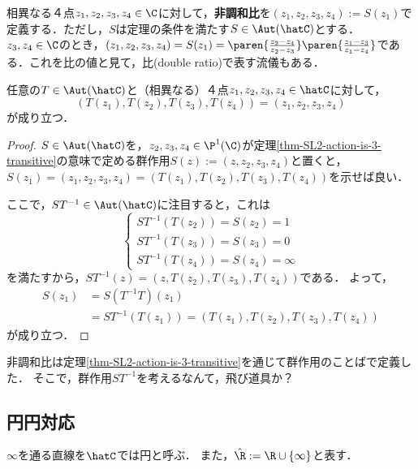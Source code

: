 \documentclass[uplatex, dvipdfmx]{jsreport}
\newcommand{\Pone}{\P^1(\C)}
\begin{document}
\begin{definition}
    相異なる４点$z_1,z_2,z_3,z_4\in\C$に対して，\textbf{非調和比}を$(z_1,z_2,z_3,z_4):=S(z_1)$で定義する．ただし，$S$は定理の条件を満たす$S\in\Aut(\hatC)$とする．
    $z_3,z_4\in\C$のとき，$(z_1,z_2,z_3,z_4)=S(z_1)=\paren{\frac{z_2-z_4}{z_2-z_3}}\paren{\frac{z_1-z_3}{z_1-z_4}}$である．これを比の値と見て，比(double ratio)で表す流儀もある．
\end{definition}

\begin{theorem}[非調和比は不変量である]
    任意の$T\in\Aut(\hatC)$と（相異なる）４点$z_1,z_2,z_3,z_4\in\hatC$に対して，
    \[(T(z_1),T(z_2),T(z_3),T(z_4))=(z_1,z_2,z_3,z_4)\]
    が成り立つ．
\end{theorem}
\begin{proof}
    $S\in\Aut(\hatC)$を，$z_2,z_3,z_4\in\Pone$が定理\ref{thm-SL2-action-is-3-transitive}の意味で定める群作用$S(z):=(z,z_2,z_3,z_4)$と置くと，
    $S(z_1)=(z_1,z_2,z_3,z_4)=(T(z_1),T(z_2),T(z_3),T(z_4))$を示せば良い．

    ここで，$ST^{-1}\in\Aut(\hatC)$に注目すると，これは
    \[\begin{cases}
        ST^{-1}(T(z_2))=S(z_2)=1\\
        ST^{-1}(T(z_3))=S(z_3)=0\\
        ST^{-1}(T(z_4))=S(z_4)=\infty
    \end{cases}\]
    を満たすから，$ST^{-1}(z)=(z,T(z_2),T(z_3),T(z_4))$である．
    よって，
    \begin{align*}
        S(z_1)&=S(T^{-1}T)(z_1)\\
        &=ST^{-1}(T(z_1))=(T(z_1),T(z_2),T(z_3),T(z_4))
    \end{align*}
    が成り立つ．
\end{proof}
\begin{remarks}
    非調和比は定理\ref{thm-SL2-action-is-3-transitive}を通じて群作用のことばで定義した．
    そこで，群作用$ST^{-1}$を考えるなんて，飛び道具か？
\end{remarks}

\subsection{円円対応}

\begin{notation}
    $\infty$を通る直線を$\hatC$では円と呼ぶ．
    また，$\hat{\R}:=\R\cup\{\infty\}$と表す．
\end{notation}
\end{document}
